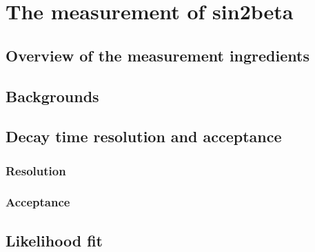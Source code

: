 
\chapter{The measurement of sin2beta}
\label{ch:measurement_of_sin2beta}

\section{Overview of the measurement ingredients}
\label{sec:measurement_of_sin2beta:overview}





\clearpage
\section{Backgrounds}
\label{sec:measurement_of_sin2beta:physic_backgrounds}
\section{Decay time resolution and acceptance}
\label{sec:measurement_of_sin2beta:resolution_and_acceptance}
\subsection{Resolution}
\label{sec:measurement_of_sin2beta:resolution_and_acceptance:resolution}
\subsection{Acceptance}
\label{sec:measurement_of_sin2beta:resolution_and_acceptance:acceptance}
\section{Likelihood fit}
\label{sec:measurement_of_sin2beta:likelihood_fit}
